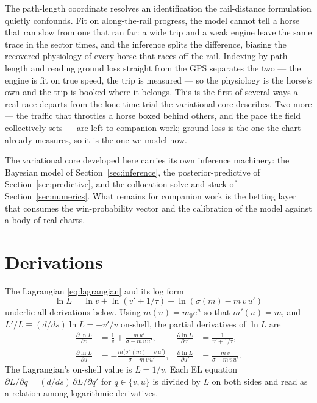 \documentclass[11pt]{article}
\begin{document}
The path-length coordinate resolves an identification the rail-distance formulation quietly confounds. Fit on along-the-rail progress, the model cannot tell a horse that ran slow from one that ran far: a wide trip and a weak engine leave the same trace in the sector times, and the inference splits the difference, biasing the recovered physiology of every horse that races off the rail. Indexing by path length and reading ground loss straight from the GPS separates the two --- the engine is fit on true speed, the trip is measured --- so the physiology is the horse's own and the trip is booked where it belongs. This is the first of several ways a real race departs from the lone time trial the variational core describes. Two more --- the traffic that throttles a horse boxed behind others, and the pace the field collectively sets --- are left to companion work; ground loss is the one the chart already measures, so it is the one we model now.

The variational core developed here carries its own inference machinery: the Bayesian model of Section~\ref{sec:inference}, the posterior-predictive of Section~\ref{sec:predictive}, and the collocation solve and stack of Section~\ref{sec:numerics}. What remains for companion work is the betting layer that consumes the win-probability vector and the calibration of the model against a body of real charts.

\appendix
\section{Derivations}

The Lagrangian \eqref{eq:lagrangian} and its log form
\begin{equation}
\ln L = \ln v + \ln(v' + 1/\tau) - \ln(\sigma(m) - m\, v\, u')
\end{equation}
underlie all derivations below. Using $m(u) = m_0 e^u$ so that $m'(u) = m$, and $L'/L \equiv (d/ds) \ln L = -v'/v$ on-shell, the partial derivatives of $\ln L$ are
\begin{align*}
\frac{\partial \ln L}{\partial v} &= \frac{1}{v} + \frac{m\, u'}{\sigma - m\, v\, u'}, &
\frac{\partial \ln L}{\partial v'} &= \frac{1}{v' + 1/\tau}, \\
\frac{\partial \ln L}{\partial u} &= -\frac{m\bigl(\sigma'(m) - v\, u'\bigr)}{\sigma - m\, v\, u'}, &
\frac{\partial \ln L}{\partial u'} &= \frac{m\, v}{\sigma - m\, v\, u'}.
\end{align*}
The Lagrangian's on-shell value is $L = 1/v$. Each EL equation $\partial L/\partial q = (d/ds)\, \partial L/\partial q'$ for $q \in \{v, u\}$ is divided by $L$ on both sides and read as a relation among logarithmic derivatives.
\end{document}
